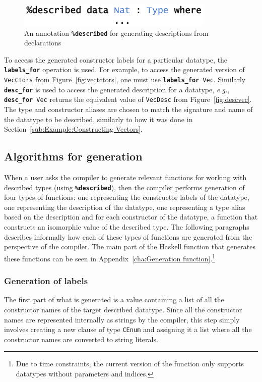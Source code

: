 \documentclass{ituthesis}
\newcommand{\tttype}[1]{\textcolor{type-color}{\texttt{#1}}}
\newcommand{\ttdec}[1]{\textcolor{declared-var-color}{\texttt{#1}}}
\theoremstyle{break}
\begin{document}
\begin{figure}
\begin{center}
    \includegraphics[scale=0.5]{Figures/NatDeclarationGen.png}
\end{center}
\caption{An annotation \texttt{\textbf{\%described}} for generating descriptions from declarations}
\label{fig:natdeclgen}
\end{figure}

To access the generated constructor labels for a particular datatype, the \texttt{\textbf{labels\_for}} operation is used.
For example, to access the generated version of \ttdec{VecCtors} from Figure~\ref{fig:vectctors}, one must use \texttt{\textbf{labels\_for}}~\tttype{Vec}.
Similarly \texttt{\textbf{desc\_for}} is used to access the generated description for a datatype, \textit{e.g.}, \texttt{\textbf{desc\_for}}~\tttype{Vec} returns the equivalent value of \ttdec{VecDesc} from Figure~\ref{fig:descvec}.
The type and constructor aliases are chosen to match the signature and name of the datatype to be described, similarly to how it was done in Section~\ref{sub:Example:Constructing Vectors}.

\subsection{Algorithms for generation}
\label{sub:Algorithms for generation}
When a user asks the compiler to generate relevant functions for working with described types (using \texttt{\textbf{\%described}}), then the compiler performs generation of four types of functions:
one representing the constructor labels of the datatype, one representing the description of the datatype, one representing a type alias based on the description and for each constructor of the datatype, a function that constructs an isomorphic value of the described type.
The following paragraphs describes informally how each of these types of functions are generated from the perspective of the compiler.
The main part of the Haskell function that generates these functions can be seen in Appendix~\ref{cha:Generation function}.\footnote{Due to time constraints, the current version of the function only supports datatypes without parameters and indices.}

\subsubsection{Generation of labels}
\label{ssub:Generation of labels}
The first part of what is generated is a value containing a list of all the constructor names of the target described datatype.
Since all the constructor names are represented internally as strings by the compiler, this step simply involves creating a new clause of type \tttype{CEnum} and assigning it a list where all the constructor names are converted to string literals.
\end{document}
